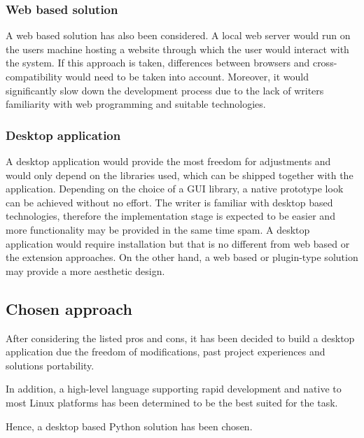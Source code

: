 	\subsubsection{Web based solution}
	A web based solution has also been considered. A local web server would run on the users machine hosting a website through which the user would interact with the system. If this approach is taken, differences between browsers and cross-compatibility would need to be taken into account. Moreover, it would significantly slow down the development process due to the lack of writers familiarity with web programming and suitable technologies.
	
	\subsubsection{Desktop application}
	A desktop application would provide the most freedom for adjustments and would only depend on the libraries used, which can be shipped together with the application. Depending on the choice of a GUI library, a native prototype look can be achieved without no effort. The writer is familiar with desktop based technologies, therefore the implementation stage is expected to be easier and more functionality may be provided in the same time spam. A desktop application would require installation but that is no different from web based or the extension approaches. On the other hand, a web based or plugin-type solution may provide a more aesthetic design.

\subsection{Chosen approach}
	After considering the listed pros and cons, it has been decided to build a desktop application due the freedom of modifications, past project experiences and solutions portability.
	
	In addition, a high-level language supporting rapid development and native to most Linux platforms has been determined to be the best suited for the task.
	
	Hence, a desktop based Python solution has been chosen.

